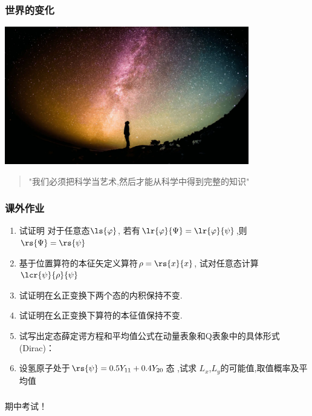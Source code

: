 \begin{frame}
      \frametitle{世界的变化}
        \begin{center}
             \includegraphics[width=0.8\textwidth]{figs/2022-04-10-10-07-10.png}
        \end{center}   
        \begin{quotation}
            "我们必须把科学当艺术,然后才能从科学中得到完整的知识"  \\
        \end{quotation}  
\end{frame}
\begin{frame}
    \frametitle{课外作业}
    \begin{enumerate}
        \item 试证明 对于任意态$\ls{\varphi}$, 若有$\lr{\varphi}{\Psi}=\lr{\varphi}{\psi} $,则$ \rs{\Psi}=\rs{\psi}$ 
        \item 基于位置算符的本征矢定义算符$\rho=\rs{x}{x}$, 试对任意态计算$\lcr{\psi}{\rho}{\psi}$
        \item 试证明在幺正变换下两个态的内积保持不变.
        \item 试证明在幺正变换下算符的本征值保持不变.
        \item 试写出定态薛定谔方程和平均值公式在动量表象和Q表象中的具体形式 (Dirac)：
        \item 设氢原子处于$\rs{\psi}=0.5Y_{11}+0.4Y_{20}$态 ,试求 $L_x$,$L_y$的可能值,取值概率及平均值 
    \end{enumerate}
\end{frame}
\begin{frame}
    \frametitle{}  
    \centering
    \LARGE \color{red} 期中考试！ \\
\end{frame}